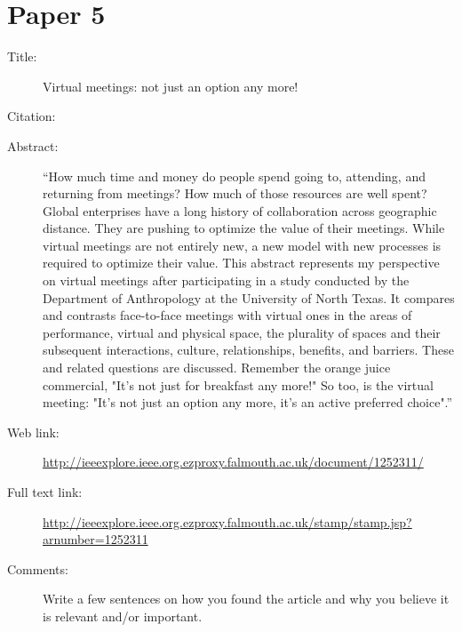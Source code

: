 \documentclass{scrartcl}
\begin{document}
\section*{Paper 5}
\begin{description}
\item[Title:] Virtual meetings: not just an option any more!
\item[Citation:] \cite{bibtex_key}
\item[Abstract:] ``How much time and money do people spend going to, attending, and returning from meetings? How much of those resources are well spent? Global enterprises have a long history of collaboration across geographic distance. They are pushing to optimize the value of their meetings. While virtual meetings are not entirely new, a new model with new processes is required to optimize their value. This abstract represents my perspective on virtual meetings after participating in a study conducted by the Department of Anthropology at the University of North Texas. It compares and contrasts face-to-face meetings with virtual ones in the areas of performance, virtual and physical space, the plurality of spaces and their subsequent interactions, culture, relationships, benefits, and barriers. These and related questions are discussed. Remember the orange juice commercial, "It's not just for breakfast any more!" So too, is the virtual meeting: "It's not just an option any more, it's an active preferred choice".''
\item[Web link:] \url{http://ieeexplore.ieee.org.ezproxy.falmouth.ac.uk/document/1252311/}
\item[Full text link:] \url{http://ieeexplore.ieee.org.ezproxy.falmouth.ac.uk/stamp/stamp.jsp?arnumber=1252311}
\item[Comments:] Write a few sentences on how you found the article and why you believe it is relevant and/or important.
\end{description}
\end{document}
